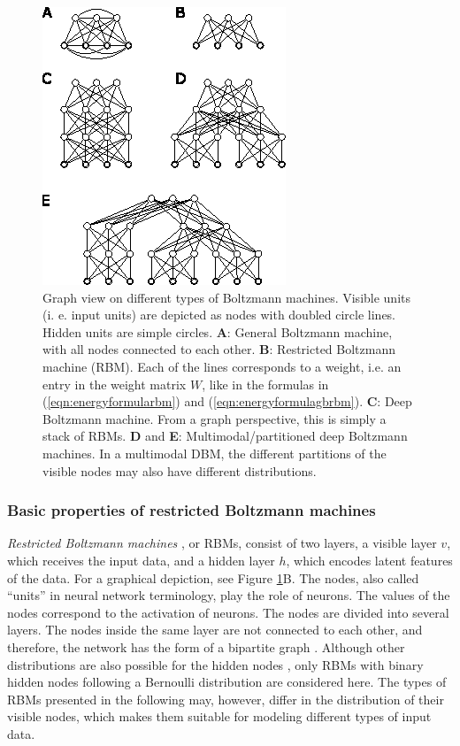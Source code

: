 \documentclass[12pt]{article}
\begin{document}
\begin{figure}[h]

   \centering
   \includegraphics[scale=3.]{images/BMsOverview.eps}
   \caption{Graph view on different types of Boltzmann machines. Visible units (i. e. input units) are depicted as nodes with doubled circle lines. Hidden units are simple circles.
 {\bf A}: General Boltzmann machine, with all nodes connected to each other. {\bf B}: Restricted Boltzmann machine (RBM). Each of the lines corresponds to a weight, i.e. an entry in the weight matrix $W$, like in the formulas in (\ref{eqn:energyformularbm})  and (\ref{eqn:energyformulagbrbm}).
{\bf C}: Deep Boltzmann machine. From a graph perspective, this is simply a stack of RBMs.
{\bf D} and {\bf E}: Multimodal/partitioned deep Boltzmann machines. In a multimodal DBM, the different partitions of the visible nodes may also have different distributions.}
   \label{fig:bmsoverview}
 \end{figure}


\subsubsection{Basic properties of restricted Boltzmann machines}\label{rbmtypes}

\emph{Restricted Boltzmann machines} \citep{smolensky1986foundations}, or RBMs,  consist of two layers, a visible layer $v$, which receives the input data, and a hidden layer $h$, which encodes latent features of the data. For a graphical depiction, see Figure \ref{fig:bmsoverview}B.
The nodes, also called ``units'' in neural network terminology, play the role of neurons.
The values of the nodes correspond to the activation of neurons.
The nodes are divided into several layers.
The nodes inside the same layer are not connected to each other, and therefore, the network has the form of a bipartite graph \citep{diestelgraph}.
Although other distributions are also possible for the hidden nodes \citep{hinton_practical_2012}, only RBMs with binary hidden nodes following a Bernoulli distribution are considered here.
The types of RBMs presented in the following may, however, differ in the distribution of their visible nodes, which makes them suitable for modeling different types of input data.
\end{document}
